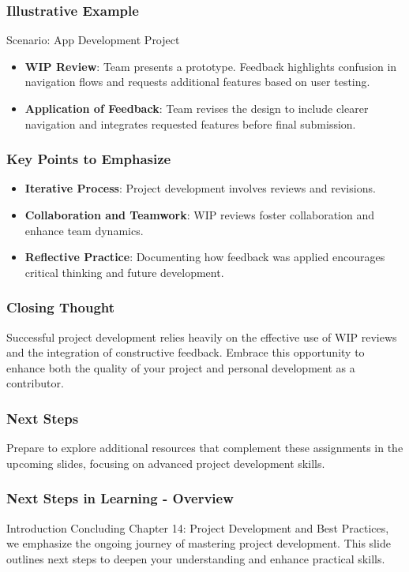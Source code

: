 \documentclass[aspectratio=169]{beamer}
\begin{document}
\begin{frame}[fragile]
    \frametitle{Illustrative Example}
    \begin{block}{Scenario: App Development Project}
        \begin{itemize}
            \item \textbf{WIP Review}: Team presents a prototype. Feedback highlights confusion in navigation flows and requests additional features based on user testing.
            \item \textbf{Application of Feedback}: Team revises the design to include clearer navigation and integrates requested features before final submission.
        \end{itemize}
    \end{block}
\end{frame}

\begin{frame}[fragile]
    \frametitle{Key Points to Emphasize}
    \begin{itemize}
        \item \textbf{Iterative Process}: Project development involves reviews and revisions.
        \item \textbf{Collaboration and Teamwork}: WIP reviews foster collaboration and enhance team dynamics.
        \item \textbf{Reflective Practice}: Documenting how feedback was applied encourages critical thinking and future development.
    \end{itemize}
\end{frame}

\begin{frame}[fragile]
    \frametitle{Closing Thought}
    Successful project development relies heavily on the effective use of WIP reviews and the integration of constructive feedback. Embrace this opportunity to enhance both the quality of your project and personal development as a contributor.
\end{frame}

\begin{frame}[fragile]
    \frametitle{Next Steps}
    Prepare to explore additional resources that complement these assignments in the upcoming slides, focusing on advanced project development skills.
\end{frame}

\begin{frame}[fragile]
    \frametitle{Next Steps in Learning - Overview}
    \begin{block}{Introduction}
        Concluding Chapter 14: Project Development and Best Practices, we emphasize the ongoing journey of mastering project development. This slide outlines next steps to deepen your understanding and enhance practical skills.
    \end{block}
\end{frame}
\end{document}
